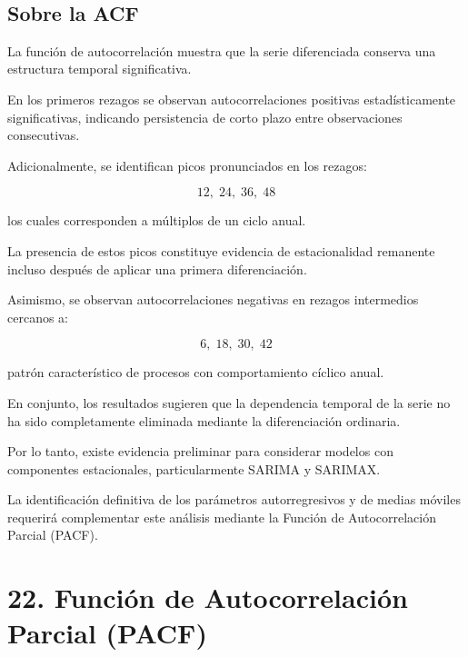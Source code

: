 \documentclass[11pt]{article}
\begin{document}
    
    \begin{center}
    \end{center}
    { \hspace*{\fill} \\}
    
    \hypertarget{sobre-la-acf}{%
\subsection{Sobre la ACF}\label{sobre-la-acf}}

La función de autocorrelación muestra que la serie diferenciada conserva
una estructura temporal significativa.

En los primeros rezagos se observan autocorrelaciones positivas
estadísticamente significativas, indicando persistencia de corto plazo
entre observaciones consecutivas.

Adicionalmente, se identifican picos pronunciados en los rezagos:

\[
12,\;24,\;36,\;48
\]

los cuales corresponden a múltiplos de un ciclo anual.

La presencia de estos picos constituye evidencia de estacionalidad
remanente incluso después de aplicar una primera diferenciación.

Asimismo, se observan autocorrelaciones negativas en rezagos intermedios
cercanos a:

\[
6,\;18,\;30,\;42
\]

patrón característico de procesos con comportamiento cíclico anual.

En conjunto, los resultados sugieren que la dependencia temporal de la
serie no ha sido completamente eliminada mediante la diferenciación
ordinaria.

Por lo tanto, existe evidencia preliminar para considerar modelos con
componentes estacionales, particularmente SARIMA y SARIMAX.

La identificación definitiva de los parámetros autorregresivos y de
medias móviles requerirá complementar este análisis mediante la Función
de Autocorrelación Parcial (PACF).

    \hypertarget{funciuxf3n-de-autocorrelaciuxf3n-parcial-pacf}{%
\section{22. Función de Autocorrelación Parcial
(PACF)}\label{funciuxf3n-de-autocorrelaciuxf3n-parcial-pacf}}
\end{document}
